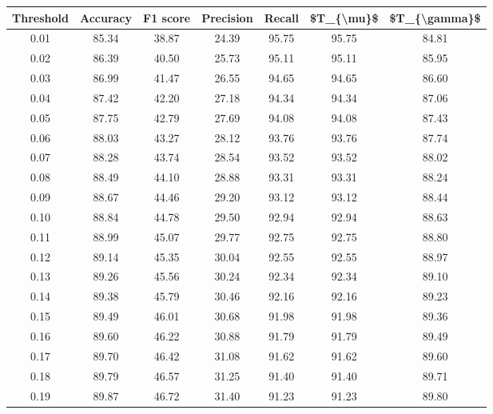 \begin{tabular}{|c|c|c|c|c|c|c|}
\hline
 Threshold &  Accuracy &  F1 score &  Precision &  Recall &  \$T\_\{\textbackslash mu\}\$ &  \$T\_\{\textbackslash gamma\}\$ \\
\hline
      0.01 &     85.34 &     38.87 &      24.39 &   95.75 &      95.75 &         84.81 \\
      0.02 &     86.39 &     40.50 &      25.73 &   95.11 &      95.11 &         85.95 \\
      0.03 &     86.99 &     41.47 &      26.55 &   94.65 &      94.65 &         86.60 \\
      0.04 &     87.42 &     42.20 &      27.18 &   94.34 &      94.34 &         87.06 \\
      0.05 &     87.75 &     42.79 &      27.69 &   94.08 &      94.08 &         87.43 \\
      0.06 &     88.03 &     43.27 &      28.12 &   93.76 &      93.76 &         87.74 \\
      0.07 &     88.28 &     43.74 &      28.54 &   93.52 &      93.52 &         88.02 \\
      0.08 &     88.49 &     44.10 &      28.88 &   93.31 &      93.31 &         88.24 \\
      0.09 &     88.67 &     44.46 &      29.20 &   93.12 &      93.12 &         88.44 \\
      0.10 &     88.84 &     44.78 &      29.50 &   92.94 &      92.94 &         88.63 \\
      0.11 &     88.99 &     45.07 &      29.77 &   92.75 &      92.75 &         88.80 \\
      0.12 &     89.14 &     45.35 &      30.04 &   92.55 &      92.55 &         88.97 \\
      0.13 &     89.26 &     45.56 &      30.24 &   92.34 &      92.34 &         89.10 \\
      0.14 &     89.38 &     45.79 &      30.46 &   92.16 &      92.16 &         89.23 \\
      0.15 &     89.49 &     46.01 &      30.68 &   91.98 &      91.98 &         89.36 \\
      0.16 &     89.60 &     46.22 &      30.88 &   91.79 &      91.79 &         89.49 \\
      0.17 &     89.70 &     46.42 &      31.08 &   91.62 &      91.62 &         89.60 \\
      0.18 &     89.79 &     46.57 &      31.25 &   91.40 &      91.40 &         89.71 \\
      0.19 &     89.87 &     46.72 &      31.40 &   91.23 &      91.23 &         89.80 \\

\end{tabular}
